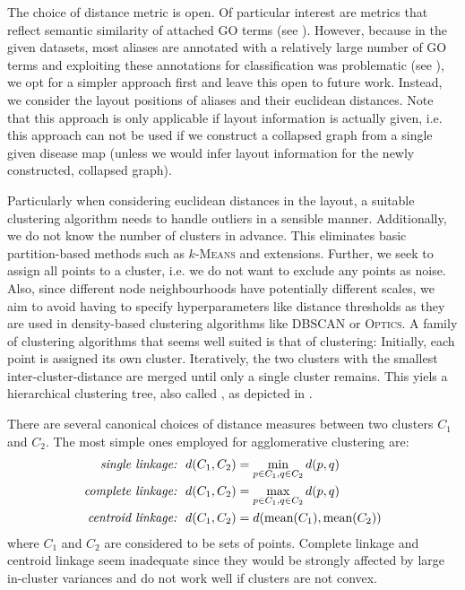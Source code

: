 \documentclass[
	fontsize=10pt, %
	twoside=false, %
	secnumdepth=1, %
  toc=indentunnumbered %
]{kaobook}
\begin{document}
The choice of distance metric is open. Of particular interest are metrics that
reflect semantic similarity of attached GO terms
(see ).
However, because in the given
datasets, most aliases are annotated with a relatively large number of GO terms
and exploiting these annotations for classification was problematic (see ),
we opt for a
simpler approach first and leave this open to future work. 
Instead, we consider the layout positions of aliases and their euclidean
distances. Note that this approach is only applicable if layout information is
actually given, i.e. this approach can not be used if we construct a collapsed
graph from a single given disease map (unless we would infer layout information
for the newly constructed, collapsed graph).

Particularly when considering euclidean distances in the layout, a suitable
clustering algorithm needs to handle outliers in a sensible manner.
Additionally, we do not know the number of clusters in advance. This eliminates
basic partition-based methods such as $k$-\textsc{Means} and extensions.
%
Further, we seek to assign all points to a cluster, i.e. we do not want to
exclude any points as noise. Also, since different node neighbourhoods have
potentially different scales, we aim to avoid having to specify hyperparameters
like distance thresholds as they are used in density-based clustering algorithms
like \textsc{DBSCAN} or \textsc{Optics}.
%
A family of clustering algorithms that seems well suited is that of
 clustering: Initially, each point is assigned its own
cluster. Iteratively, the two clusters with the smallest inter-cluster-distance
are merged until only a single cluster remains. This yiels a hierarchical
clustering tree, also called , as depicted in
.

There are several canonical choices of distance measures between two clusters $C_1$ and
$C_2$. The most simple ones employed for agglomerative clustering are:
\begin{align*}
  \text{{\textit{{single linkage:}}}} &~~ d(C_1, C_2) = \min_{p \in C_1, q \in C_2} d(p,q) \\
  \text{{\textit{{complete linkage:}}}} &~~ d(C_1, C_2) = \max_{p \in C_1, q \in C_2} d(p,q) \\
  \text{{\textit{{centroid linkage:}}}} &~~ d(C_1, C_2) = d(\text{mean}(C_1),\text{mean}(C_2))
\end{align*}
where $C_1$ and $C_2$ are considered to be sets of points. Complete linkage and
centroid linkage seem inadequate since they would be strongly affected by large
in-cluster variances and do not work well if clusters are not convex.
\end{document}
